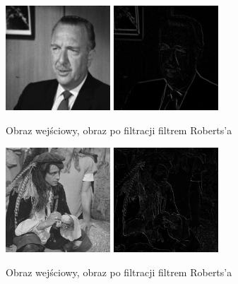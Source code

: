 \documentclass[final,a4paper,openany,12pt]{mwbk}
\begin{document}
\begin{figure}[H]
	\begin{center}
		\includegraphics[width=0.35\textwidth]{gentelman_gray}
		\includegraphics[width=0.35\textwidth]{gentelman_gray_highpassRoberts_result}
	\end{center}
	\caption{Obraz wejściowy, obraz po filtracji filtrem Roberts'a}
\end{figure}

\begin{figure}[H]
	\begin{center}
		\includegraphics[width=0.35\textwidth]{pirate_gray}
		\includegraphics[width=0.35\textwidth]{pirate_gray_highpassRoberts_result}
	\end{center}
	\caption{Obraz wejściowy, obraz po filtracji filtrem Roberts'a}
\end{figure}
\end{document}
